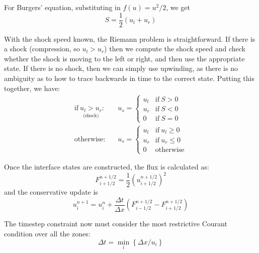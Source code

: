 For Burgers' equation, substituting in $f(u) = u^2/2$, we get
\begin{equation}
S = \frac{1}{2}(u_l + u_r)
\end{equation}

With the shock speed known, the Riemann problem is straightforward.  If there
is a shock (compression, so $u_l > u_r$) then we compute the shock speed and
check whether the shock is moving to the left or right, and then use the appropriate
state.  If there is no shock, then we can simply use upwinding, as there is no
ambiguity as to how to trace backwards in time to the correct state.
Putting this together, we have:
\begin{eqnarray}
\mathrm{if~} \underset{\text{(shock)}}{u_l > u_r}:&& u_s = \left \{ \begin{array}{cl}
                u_l & \mathrm{if~} S > 0 \\ 
                u_r & \mathrm{if~} S < 0 \\
                0   & \mathrm{if~} S = 0 \end{array} \right .   \\[1em]
%
\mathrm{otherwise:}&& u_s = \left \{ \begin{array}{clc}
                u_l & \mathrm{if~} u_l \ge 0 \\  
                u_r & \mathrm{if~} u_r \le 0 \\  
                0   & \mathrm{otherwise} \end{array} \right .   
\end{eqnarray}
               
Once the interface states are constructed, the flux is calculated as:
\begin{equation}
F^{n+1/2}_{i+1/2} = \frac{1}{2} \left (u_{i+1/2}^{n+1/2} \right )^2
\end{equation}
and the conservative update is
\begin{equation}
u_i^{n+1} = u_i^n + \frac{\Delta t}{\Delta x} 
   \left ( F_{i-1/2}^{n+1/2} - F_{i+1/2}^{n+1/2} \right )
\end{equation}

The timestep constraint now must consider the most restrictive Courant 
condition over all the zones:
\begin{equation}
\Delta t = \min_i \left \{ \Delta x / u_i \right \}
\end{equation}


